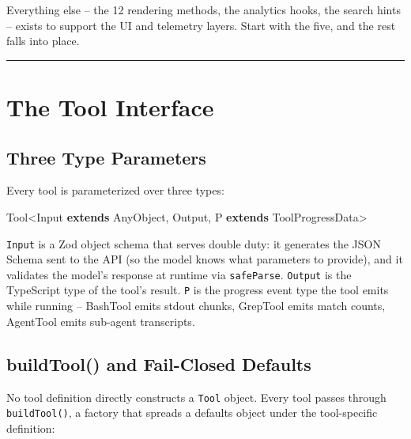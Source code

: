 \documentclass[
  english,
  11pt,
  letterpaper,
]{book}
\newenvironment{Shaded}{\begin{snugshade}}{\end{snugshade}}
\newcommand{\KeywordTok}[1]{\textcolor[rgb]{0.00,0.23,0.31}{\textbf{#1}}}
\newcommand{\NormalTok}[1]{\textcolor[rgb]{0.00,0.23,0.31}{#1}}
\newcommand{\OperatorTok}[1]{\textcolor[rgb]{0.37,0.37,0.37}{#1}}
\begin{document}
Everything else -- the 12 rendering methods, the analytics hooks, the
search hints -- exists to support the UI and telemetry layers. Start
with the five, and the rest falls into place.

\begin{center}\rule{0.5\linewidth}{0.5pt}\end{center}

\section{The Tool Interface}\label{the-tool-interface}

\subsection{Three Type Parameters}\label{three-type-parameters}

Every tool is parameterized over three types:

\begin{Shaded}
\begin{Highlighting}[]
\NormalTok{Tool}\OperatorTok{\textless{}}\NormalTok{Input }\KeywordTok{extends}\NormalTok{ AnyObject}\OperatorTok{,}\NormalTok{ Output}\OperatorTok{,}\NormalTok{ P }\KeywordTok{extends}\NormalTok{ ToolProgressData}\OperatorTok{\textgreater{}}
\end{Highlighting}
\end{Shaded}

\texttt{Input} is a Zod object schema that serves double duty: it
generates the JSON Schema sent to the API (so the model knows what
parameters to provide), and it validates the model's response at runtime
via \texttt{safeParse}. \texttt{Output} is the TypeScript type of the
tool's result. \texttt{P} is the progress event type the tool emits
while running -- BashTool emits stdout chunks, GrepTool emits match
counts, AgentTool emits sub-agent transcripts.

\subsection{buildTool() and Fail-Closed
Defaults}\label{buildtool-and-fail-closed-defaults}

No tool definition directly constructs a \texttt{Tool} object. Every
tool passes through \texttt{buildTool()}, a factory that spreads a
defaults object under the tool-specific definition:
\end{document}
